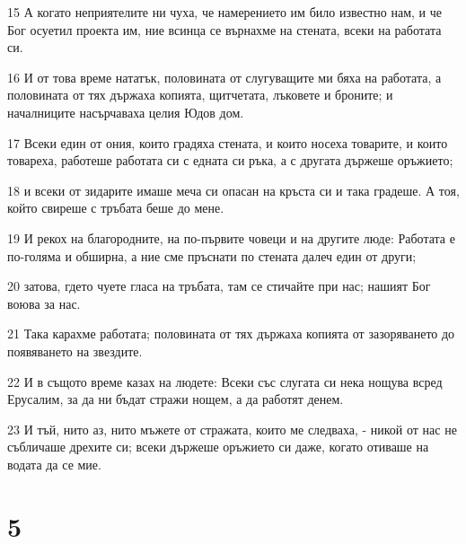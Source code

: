 \par 15 А когато неприятелите ни чуха, че намерението им било известно нам, и че Бог осуетил проекта им, ние всинца се върнахме на стената, всеки на работата си.
\par 16 И от това време нататък, половината от слугуващите ми бяха на работата, а половината от тях държаха копията, щитчетата, лъковете и броните; и началниците насърчаваха целия Юдов дом.
\par 17 Всеки един от ония, които градяха стената, и които носеха товарите, и които товареха, работеше работата си с едната си ръка, а с другата държеше оръжието;
\par 18 и всеки от зидарите имаше меча си опасан на кръста си и така градеше. А тоя, който свиреше с тръбата беше до мене.
\par 19 И рекох на благородните, на по-първите човеци и на другите люде: Работата е по-голяма и обширна, а ние сме пръснати по стената далеч един от други;
\par 20 затова, гдето чуете гласа на тръбата, там се стичайте при нас; нашият Бог воюва за нас.
\par 21 Така карахме работата; половината от тях държаха копията от зазоряването до появяването на звездите.
\par 22 И в същото време казах на людете: Всеки със слугата си нека нощува всред Ерусалим, за да ни бъдат стражи нощем, а да работят денем.
\par 23 И тъй, нито аз, нито мъжете от стражата, които ме следваха, - никой от нас не събличаше дрехите си; всеки държеше оръжието си даже, когато отиваше на водата да се мие.

\chapter{5}

